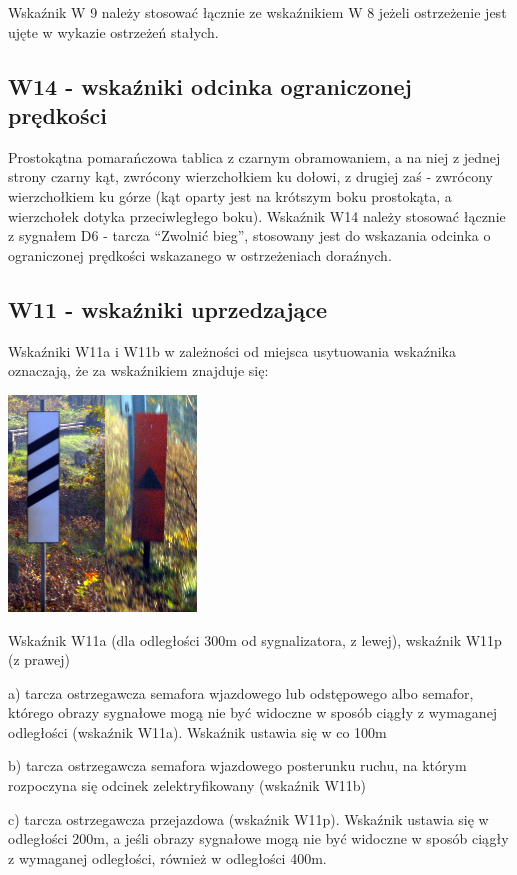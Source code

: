 Wskaźnik W 9 należy stosować łącznie ze wskaźnikiem W 8 jeżeli ostrzeżenie jest ujęte w wykazie ostrzeżeń stałych. 

\subsection{W14 - wskaźniki odcinka ograniczonej prędkości}

Prostokątna pomarańczowa tablica z czarnym obramowaniem, a na niej z jednej strony czarny kąt, zwrócony wierzchołkiem ku dołowi, z drugiej zaś - zwrócony wierzchołkiem ku górze (kąt oparty jest na krótszym boku prostokąta, a wierzchołek dotyka przeciwległego boku). Wskaźnik W14 należy stosować łącznie z sygnałem D6 - tarcza “Zwolnić bieg”, stosowany jest do wskazania odcinka o ograniczonej prędkości wskazanego w ostrzeżeniach doraźnych. 

\subsection{W11 - wskaźniki uprzedzające}

Wskaźniki W11a i W11b w zależności od miejsca usytuowania wskaźnika oznaczają, że za wskaźnikiem znajduje się:
	\begin{marginfigure}
	\includegraphics[width=5cm]{skryptkierownik-img/wskazniki-w11.jpg}
	\caption{Wskaźnik W11a (dla odległości 300m od sygnalizatora, z lewej), wskaźnik W11p (z prawej)} 
\end{marginfigure}
a) tarcza ostrzegawcza semafora wjazdowego lub odstępowego albo semafor, którego obrazy sygnałowe mogą nie być widoczne w sposób ciągły z wymaganej odległości (wskaźnik W11a). Wskaźnik ustawia się w co 100m

b) tarcza ostrzegawcza semafora wjazdowego posterunku ruchu, na którym rozpoczyna się odcinek zelektryfikowany (wskaźnik W11b)

c) tarcza ostrzegawcza przejazdowa (wskaźnik W11p). Wskaźnik ustawia się w odległości 200m, a jeśli obrazy sygnałowe mogą nie być widoczne w sposób ciągły z wymaganej odległości, również w odległości 400m.

